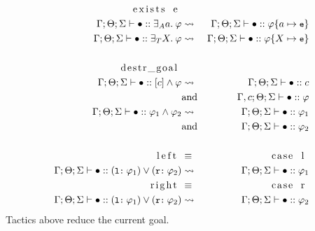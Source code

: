 \documentclass[english, mgr]{iithesis}
\renewcommand{\tt}[1]{\texttt{\small{#1}}}
\begin{document}
\begin{eqnarray*}
  \text{\lstinline[columns=fixed]{exists e} }& & \\
  \jgmnt[\Gamma; \Theta; \Sigma]{\hole\ofkind{\fExistsAtom{\atomv}{\formphi}}} & \leadsto & \jgmnt[\Gamma; \Theta; \Sigma]{\hole\ofkind{\formphi\subst{\atomv}{\tt{e}}}} \\
  \jgmnt[\Gamma; \Theta; \Sigma]{\hole\ofkind{\fExistsTerm{\termv}{\formphi}}} & \leadsto & \jgmnt[\Gamma; \Theta; \Sigma]{\hole\ofkind{\formphi\subst{\termv}{\tt{e}}}} \\
  & & \\
  \text{\lstinline[columns=fixed]{destr_goal} }& & \\
  \jgmnt[\Gamma; \Theta; \Sigma]{\hole\ofkind{\fCAnd{\constr}\formphi}} & \leadsto & \jgmnt[\Gamma; \Theta;\Sigma]{\hole\ofkind{\constr}} \\
  & \text{and} & \jgmnt[\Gamma, \constr; \Theta;\Sigma]{\hole\ofkind{\formphi}} \\
  \jgmnt[\Gamma; \Theta; \Sigma]{\hole\ofkind{\formphi_1 \wedge \formphi_2}} & \leadsto & \jgmnt[\Gamma; \Theta;\Sigma]{\hole\ofkind{\formphi_1}} \\
  & \text{and} & \jgmnt[\Gamma; \Theta;\Sigma]{\hole\ofkind{\formphi_2}} \\
  & & \\
  \text{\lstinline[columns=fixed]{left} } & \equiv &  \text{\lstinline[columns=fixed]{case l} } \\
  \jgmnt[\Gamma; \Theta; \Sigma]{\hole\ofkind{(\tt{l:}\:\formphi_1) \vee (\tt{r:}\:\formphi_2)}} & \leadsto & \jgmnt[\Gamma; \Theta;\Sigma]{\hole\ofkind{\formphi_1}} \\
  \text{\lstinline[columns=fixed]{right} } & \equiv &  \text{\lstinline[columns=fixed]{case r} } \\
  \jgmnt[\Gamma; \Theta; \Sigma]{\hole\ofkind{(\tt{l:}\:\formphi_1) \vee (\tt{r:}\:\formphi_2)}} & \leadsto & \jgmnt[\Gamma; \Theta;\Sigma]{\hole\ofkind{\formphi_2}} \\
  \end{eqnarray*}
Tactics above reduce the current goal.
\end{document}
